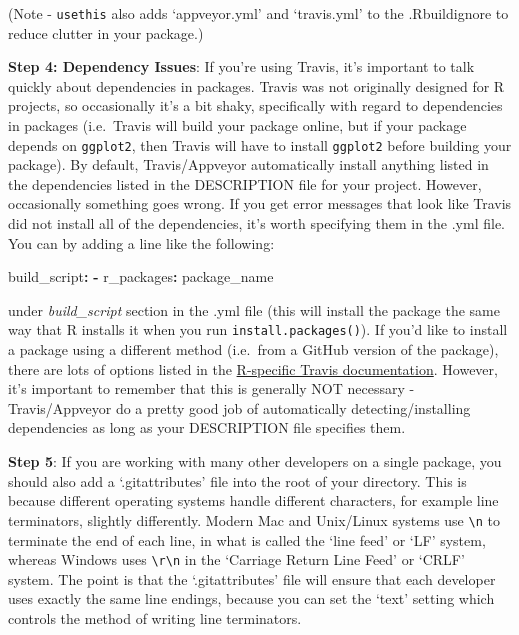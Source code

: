 \documentclass[]{book}
\newenvironment{Shaded}{\begin{snugshade}}{\end{snugshade}}
\newcommand{\StringTok}[1]{\textcolor[rgb]{0.31,0.60,0.02}{#1}}
\newcommand{\OperatorTok}[1]{\textcolor[rgb]{0.81,0.36,0.00}{\textbf{#1}}}
\newcommand{\NormalTok}[1]{#1}
\begin{document}
(Note - \texttt{usethis} also adds `appveyor.yml' and `travis.yml' to
the .Rbuildignore to reduce clutter in your package.)

\textbf{Step 4: Dependency Issues}: If you're using Travis, it's
important to talk quickly about dependencies in packages. Travis was not
originally designed for R projects, so occasionally it's a bit shaky,
specifically with regard to dependencies in packages (i.e.~Travis will
build your package online, but if your package depends on
\texttt{ggplot2}, then Travis will have to install \texttt{ggplot2}
before building your package). By default, Travis/Appveyor automatically
install anything listed in the dependencies listed in the DESCRIPTION
file for your project. However, occasionally something goes wrong. If
you get error messages that look like Travis did not install all of the
dependencies, it's worth specifying them in the .yml file. You can by
adding a line like the following:

\begin{Shaded}
\begin{Highlighting}[]
\NormalTok{build_script}\OperatorTok{:}
\StringTok{  }\OperatorTok{-}\StringTok{ }\NormalTok{r_packages}\OperatorTok{:}\StringTok{ }\NormalTok{package_name}
\end{Highlighting}
\end{Shaded}

under \emph{build\_script} section in the .yml file (this will install
the package the same way that R installs it when you run
\texttt{install.packages()}). If you'd like to install a package using a
different method (i.e.~from a GitHub version of the package), there are
lots of options listed in the
\href{https://docs.travis-ci.com/user/languages/r/}{R-specific Travis
documentation}. However, it's important to remember that this is
generally NOT necessary - Travis/Appveyor do a pretty good job of
automatically detecting/installing dependencies as long as your
DESCRIPTION file specifies them.

\textbf{Step 5}: If you are working with many other developers on a
single package, you should also add a `.gitattributes' file into the
root of your directory. This is because different operating systems
handle different characters, for example line terminators, slightly
differently. Modern Mac and Unix/Linux systems use
\texttt{\textbackslash{}n} to terminate the end of each line, in what is
called the `line feed' or `LF' system, whereas Windows uses
\texttt{\textbackslash{}r\textbackslash{}n} in the `Carriage Return Line
Feed' or `CRLF' system. The point is that the `.gitattributes' file will
ensure that each developer uses exactly the same line endings, because
you can set the `text' setting which controls the method of writing line
terminators.
\end{document}
